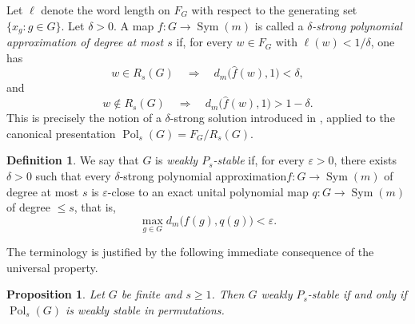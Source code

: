 \documentclass[a4paper,12pt]{amsart}
\theoremstyle{plain}
\newtheorem{proposition}[subsection]{{\bf Proposition}}
\theoremstyle{definition}
\newtheorem*{definition}{{\bf Definition}}
\theoremstyle{remark}
\numberwithin{equation}{subsection}
\DeclareMathOperator{\Sym}{Sym}
\DeclareMathOperator{\Pold}{Pol}
\begin{document}
Let $\ell$ denote the word length on $F_G$ with respect to the
generating set $\{x_g:g\in G\}$.
Let $\delta>0$.  A map
$f:G\longrightarrow\Sym(m)$
is called a \emph{$\delta$-strong polynomial approximation of degree
at most $s$} if, for every $w\in F_G$ with
$\ell(w)<1/\delta$,
one has
$$w\in R_s(G)
\quad\Longrightarrow\quad
d_m\bigl(\widehat f(w),1\bigr)<\delta,$$
and
$$w\notin R_s(G)
\quad\Longrightarrow\quad
d_m\bigl(\widehat f(w),1\bigr)>1-\delta.$$
This is precisely the notion of a $\delta$-strong solution introduced
in \cite[Definition~7.1]{AP15}, applied to the canonical presentation
$\Pold_s(G)=F_G/R_s(G)$.

\begin{definition}
\label{def:weak-Ps-stability}
We say that $G$ is \emph{weakly $P_s$-stable} if, for every
$\varepsilon>0$, there exists $\delta>0$ such that every
$\delta$-strong polynomial approximation$
f:G\longrightarrow\Sym(m)$
of degree at most $s$ is $\varepsilon$-close to an exact unital
polynomial map
$q:G\longrightarrow\Sym(m)$
of degree $\le s$,
that is,
$$\max_{g\in G}d_m\bigl(f(g),q(g)\bigr)<\varepsilon.$$
\end{definition}

The terminology is justified by the following immediate consequence
of the universal property.

\begin{proposition}
\label{prop:weak-Ps-universal}
Let $G$ be finite and $s\geq1$.  Then
$G$ weakly $P_s$-stable if and only if
$\Pold_s(G)$ is weakly stable in permutations.
\end{proposition}


\end{document}
